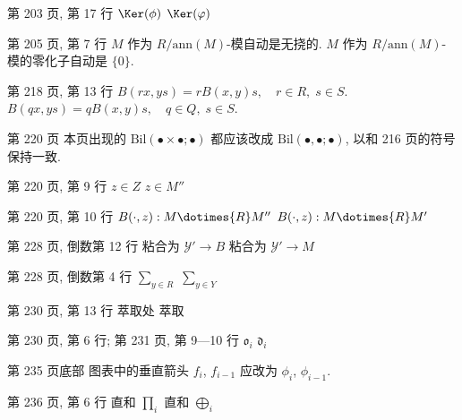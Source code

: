 \documentclass{AJerrata}
\begin{document}
\begin{Errata}
		\item[第 203 页, 第 17 行]
		\Orig $\Ker(\phi)$
		\Corr $\Ker(\varphi)$

   		\item[第 205 页, 第 7 行]
		\Orig $M$ 作为 $R/\mathrm{ann}(M)$-模自动是无挠的.
		\Corr $M$ 作为 $R/\mathrm{ann}(M)$-模的零化子自动是 $\{0\}$.

        \item[第 218 页, 第 13 行]
        \Orig $B(rx, ys) = rB(x,y)s, \quad r \in R, \; s \in S$.
        \newline
        \Corr $B(qx, ys) = qB(x,y)s, \quad q \in Q, \; s \in S$.

        \item[第 220 页]
        本页出现的 $\mathrm{Bil}(\bullet \times \bullet; \bullet)$ 都应该改成 $\mathrm{Bil}(\bullet, \bullet; \bullet)$, 以和 216 页的符号保持一致.
        
        \item[第 220 页, 第 9 行]
        \Orig $z \in Z$
        \Corr $z \in M''$
        
        \item[第 220 页, 第 10 行]
        \Orig $B(\cdot, z): M \dotimes{R} M''$
        \Corr $B(\cdot, z): M \dotimes{R} M'$
        
        \item[第 228 页, 倒数第 12 行]
        \Orig 粘合为 $\mathcal{Y}' \to B$
        \Corr 粘合为 $\mathcal{Y}' \to M$
       
        \item[第 228 页, 倒数第 4 行]
        \Orig $\sum_{y \in R}$
        \Corr $\sum_{y \in Y}$
        
        \item[第 230 页, 第 13 行]
        \Orig 萃取处
        \Corr 萃取
        
		\item[第 230 页, 第 6 行; 第 231 页, 第 9---10 行]
		\Orig $\mathfrak{o}_i$
		\Corr $\mathfrak{d}_i$
        
        \item[第 235 页底部]
        图表中的垂直箭头 $f_i$, $f_{i-1}$ 应改为 $\phi_i$, $\phi_{i-1}$.
        
        \item[第 236 页, 第 6 行]
        \Orig 直和 $\prod_i$
        \Corr 直和 $\bigoplus_i$
        

\end{Errata}
\end{document}
